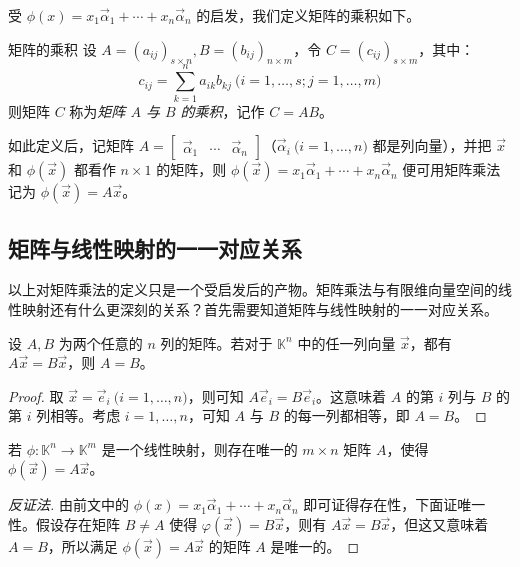 受 $\phi(x) = x_1 \vec \alpha_1 + \cdots + x_n \vec \alpha_n$ 的启发，我们定义矩阵的乘积如下。

\begin{definition}{矩阵的乘积}
	设 $A = (a_{ij})_{s \times n}, B = (b_{ij})_{n \times m}$，令 $C = (c_{ij})_{s \times m}$，其中：
	$$
	c_{ij} = \sum\limits_{k = 1}^n a_{ik} b_{kj} \pod{i = 1, \ldots, s; j = 1, \ldots, m}
	$$
	则矩阵 $C$ 称为\emph{矩阵 $A$ 与 $B$ 的乘积}，记作 $C = AB$。
\end{definition}

如此定义后，记矩阵 $A = \begin{bmatrix} \vec \alpha_1 & \cdots & \vec \alpha_n \end{bmatrix}$（$\vec \alpha_i \pod{i = 1, \ldots, n}$ 都是列向量），并把 $\vec x$ 和 $\phi(\vec x)$ 都看作 $n \times 1$ 的矩阵，则 $\phi(\vec x) = x_1 \vec \alpha_1 + \cdots + x_n \vec \alpha_n$ 便可用矩阵乘法记为 $\phi(\vec x) = A \vec x$。

\subsection{矩阵与线性映射的一一对应关系}

以上对矩阵乘法的定义只是一个受启发后的产物。矩阵乘法与有限维向量空间的线性映射还有什么更深刻的关系？首先需要知道矩阵与线性映射的一一对应关系。

\begin{theorem}
	设 $A, B$ 为两个任意的 $n$ 列的矩阵。若对于 $\mathbb K^n$ 中的任一列向量 $\vec x$，都有 $A \vec x = B \vec x$，则 $A = B$。
\end{theorem}

\begin{proof}
	取 $\vec x = \vec e_i \pod{i = 1, \ldots, n}$，则可知 $A \vec e_i = B \vec e_i$。这意味着 $A$ 的第 $i$ 列与 $B$ 的第 $i$ 列相等。考虑 $i = 1, \ldots, n$，可知 $A$ 与 $B$ 的每一列都相等，即 $A = B$。
\end{proof}

\begin{theorem}
	若 $\phi \colon \mathbb K^n \to \mathbb K^m$ 是一个线性映射，则存在唯一的 $m \times n$ 矩阵 $A$，使得 $\phi(\vec x) = A \vec x$。
\end{theorem}

\begin{proof}[反证法]
	由前文中的 $\phi(x) = x_1 \vec \alpha_1 + \cdots + x_n \vec \alpha_n$ 即可证得存在性，下面证唯一性。假设存在矩阵 $B \ne A$ 使得 $\varphi(\vec x) = B \vec x$，则有 $A \vec x = B \vec x$，但这又意味着 $A = B$，所以满足 $\phi(\vec x) = A \vec x$ 的矩阵 $A$ 是唯一的。
\end{proof}

